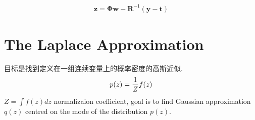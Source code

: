 \documentclass[a4paper]{article}
\begin{document}
\begin{align}
\mathbf{z} = \mathbf{\Phi} \mathbf{w} - \mathbf{R}^{-1}(\mathbf{y} - \mathbf{t})
\end{align}


\section{The Laplace Approximation}
\label{sec:4.4}
目标是找到定义在一组连续变量上的概率密度的高斯近似.
\begin{align}
  p(z) = {1 \over Z} f(z)
\end{align}
$Z = \int f(z)dz$ normalizaion coefficient, goal is to find Gaussian approximation $q(z)$ centred on the mode of the distribution $p(z)$.
\end{document}
